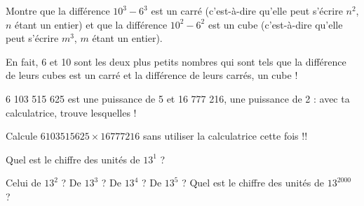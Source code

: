 \begin{enigme}[Curiosité...]

Montre que la différence $10^3 -6^3$ est un carré (c'est-à-dire qu'elle peut s'écrire $n^2$, $n$ étant un entier) et que la différence $10^2 -6^2$ est un cube (c'est-à-dire qu'elle peut s'écrire $m^3$, $m$ étant un entier).

En fait, 6 et 10 sont les deux plus petits nombres qui sont tels que la différence de leurs cubes est un carré et la différence de leurs carrés, un cube !
\end{enigme}

\vspace{2em}

\begin{enigme}
6 103 515 625 est une puissance de 5 et 16 777 216, une puissance de 2 : avec ta calculatrice, trouve lesquelles !

Calcule $6 103 515 625 \times 16 777 216$ sans utiliser la calculatrice cette fois !!
\end{enigme}

\vspace{2em}

\begin{enigme}[Je cherche !]
Quel est le chiffre des unités de $13^1$ ?

Celui de $13^2$ ? De $13^3$ ? De $13^4$ ? De $13^5$ ?
Quel est le chiffre des unités de $13^{2000}$ ?
\end{enigme}